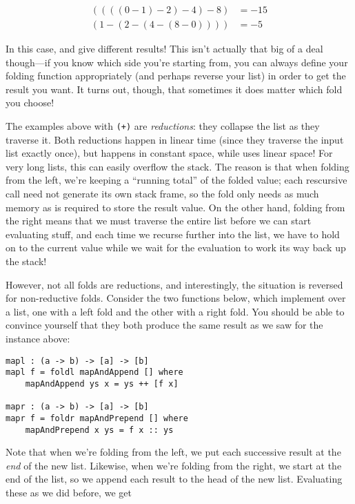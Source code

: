 \begin{align*}
((((0 - 1) - 2) - 4) - 8) &= -15 \\
(1 - (2 - (4 - (8 - 0)))) &= -5
\end{align*}

In this case,  and  give different results! This isn't actually that big of a deal though---if you know which side you're starting from, you can always define your folding function appropriately (and perhaps reverse your list) in order to get the result you want. It turns out, though, that sometimes it does matter which fold you choose!

The examples above with \texttt{(+)} are \emph{reductions}: they collapse the list as they traverse it. Both reductions happen in linear time (since they traverse the input list exactly once), but  happens in constant space, while  uses linear space! For very long lists, this can easily overflow the stack. The reason is that when folding from the left, we're keeping a ``running total'' of the folded value; each rescursive call need not generate its own stack frame, so the fold only needs as much memory as is required to store the result value. On the other hand, folding from the right means that we must traverse the entire list before we can start evaluating stuff, and each time we recurse further into the list, we have to hold on to the current value while we wait for the evaluation to work its way back up the stack!

However, not all folds are reductions, and interestingly, the situation is reversed for non-reductive folds. Consider the two functions below, which implement  over a list, one with a left fold and the other with a right fold. You should be able to convince yourself that they both produce the same result as we saw for the  instance above:

\begin{lstlisting}[language=pseudoml]
mapl : (a -> b) -> [a] -> [b]
mapl f = foldl mapAndAppend [] where
    mapAndAppend ys x = ys ++ [f x]

mapr : (a -> b) -> [a] -> [b]
mapr f = foldr mapAndPrepend [] where
    mapAndPrepend x ys = f x :: ys
\end{lstlisting}

Note that when we're folding from the left, we put each successive result at the \emph{end} of the new list. Likewise, when we're folding from the right, we start at the end of the list, so we append each result to the head of the new list. Evaluating these as we did before, we get

